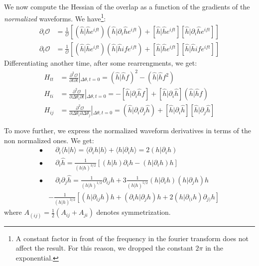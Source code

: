 \documentclass[twocolumn,showpacs,preprintnumbers,nofootinbib,prd,
superscriptaddress,10pt]{revtex4-2}
\newcommand{\scalar}[2]{\langle #1|#2 \rangle}
\newcommand{\rescalar}[2]{( #1|#2 )}
\newcommand{\imscalar}[2]{[ #1|#2 ]}
\begin{document}
We now compute the Hessian of the overlap as a function of the gradients of the {\it normalized} waveforms.
We have\footnote{
A constant factor in front of the frequency in the fourier transform does not affect the result. For this reason, we dropped the constant $2\pi$ in the exponential.}:
\begin{align}
	\partial_i \mathcal{O} &= \frac{1}{\mathcal{O}} \left[ \rescalar{\hat{h}}{\hat{h}e^{ift}}\rescalar{\hat{h}}{\partial_i\hat{h}e^{ift}} + \imscalar{\hat{h}}{\hat{h}e^{ift}}\imscalar{\hat{h}}{\partial_i\hat{h}e^{ift}} \right]\\
	\partial_t \mathcal{O} &= \frac{1}{\mathcal{O}} \left[ \rescalar{\hat{h}}{\hat{h}e^{ift}}\rescalar{\hat{h}}{\hat{h}if e^{ift}} + \imscalar{\hat{h}}{\hat{h}e^{ift}}\imscalar{\hat{h}}{\hat{h}if e^{ift}} \right]
\end{align}
Differentiating another time, after some rearrengments, we get:
\begin{align}
H_{tt} &= \frac{\partial^2 \mathcal{O}}{\partial t \partial t } \left|_{\Delta\theta, t = 0} \right.
								= \rescalar{\hat{h}}{\hat{h}f}^2 - \rescalar{\hat{h}}{\hat{h}f^2} \label{eq:H_tt}\\
H_{ti} &= \frac{\partial^2 \mathcal{O}}{\partial \Delta \theta_i \partial t } \left|_{\Delta\theta, t = 0} \right.
								= - \imscalar{\hat{h}}{\partial_i \hat{h}f} + \imscalar{\hat{h}}{\partial_i\hat{h}} \rescalar{\hat{h}}{\hat{h}f} \label{eq:H_ti}\\
H_{ij} &= \frac{\partial^2 \mathcal{O}}{\partial \Delta \theta_i \partial \Delta \theta_j }\left|_{\Delta\theta, t = 0} \right.
								= \rescalar{\hat{h}}{\partial_i\partial_j\hat{h}} +\imscalar{\hat{h}}{\partial_i\hat{h}} \imscalar{\hat{h}}{\partial_j\hat{h}} \label{eq:H_ij}
\end{align}

To move further, we express the normalized waveform derivatives in terms of the non normalized ones. We get:
\begin{align*}
	\bullet&\quad \partial_i \scalar{h}{h} = \scalar{\partial_i h}{h}+ \scalar{h}{\partial_i h} = 2 \rescalar{h}{\partial_i h} \\
	\bullet&\quad \partial_i \hat{h} =\frac{1}{\rescalar{h}{h}^{3/2}} \left[ \rescalar{h}{h}\partial_i h -  \rescalar{h}{\partial_i h} h \right]	\\
	\bullet &\quad \partial_i \partial_j \hat{h} = \frac{1}{\rescalar{h}{h}^{1/2}} \partial_{ij}h 	+3 \frac{1}{\rescalar{h}{h}^{5/2}} \rescalar{h}{\partial_i h}\rescalar{h}{\partial_j h}h \\
	&- \frac{1}{\rescalar{h}{h}^{3/2}} \left[\rescalar{h}{ \partial_{ij} h} h + \rescalar{\partial_i h}{\partial_j h}  h
		+2\rescalar{h}{\partial_{(i} h} \partial_{j)} h \right]
\end{align*}
where $A_{(ij)} = \frac{1}{2}(A_{ij}+A_{ji})$ denotes symmetrization.
\end{document}
